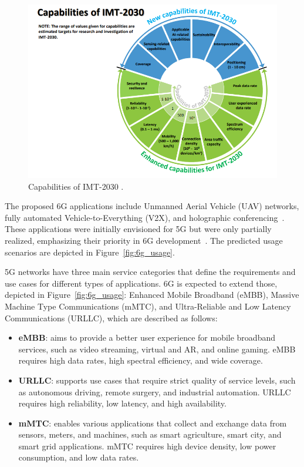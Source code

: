 \begin{figure}[H]
    \centering
    \includegraphics[width=0.8\linewidth]{figures/capabilities 6g}
    \caption[Capabilities of IMT-2030]{Capabilities of IMT-2030 \cite{ITU_2160-0}.}
    \label{fig:6g_capab}
\end{figure}

The proposed 6G applications include Unmanned Aerial Vehicle (UAV) networks, fully automated Vehicle-to-Everything (V2X), and holographic conferencing~\cite{6G_ITU}.
These applications were initially envisioned for 5G but were only partially realized, emphasizing their priority in 6G development~\cite{6G_ITU}.
The predicted usage scenarios are depicted in Figure~\ref{fig:6g_usage}.

5G networks have three main service categories that define the requirements and use cases for different types of applications.
6G is expected to extend those, depicted in Figure~\ref{fig:6g_usage}: Enhanced Mobile Broadband (eMBB), Massive Machine Type Communications (mMTC), and Ultra-Reliable and Low Latency Communications (URLLC), which are described as follows:
\begin{itemize}
    \item \textbf{eMBB}: aims to provide a better user experience for mobile broadband services, such as video streaming, virtual and AR, and online gaming.
    eMBB requires high data rates, high spectral efficiency, and wide coverage.
    \item \textbf{URLLC}: supports use cases that require strict quality of service levels, such as autonomous driving, remote surgery, and industrial automation.
    URLLC requires high reliability, low latency, and high availability.
    \item \textbf{mMTC}: enables various applications that collect and exchange data from sensors, meters, and machines, such as smart agriculture, smart city, and smart grid applications.
    mMTC requires high device density, low power consumption, and low data rates.
\end{itemize}

